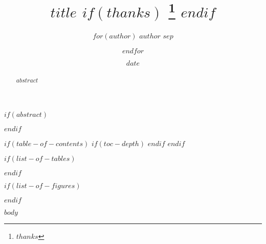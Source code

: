 \documentclass[
  $if(papersize)$
    $papersize$paper,
  $endif$
  $if(fontsize)$
    $fontsize$,
  $endif$
  $if(twocolumn)$
    twocolumn,
  $endif$
  $if(oneside)$
    oneside,
  $endif$
  $if(titlepage)$
    titlepage,
  $endif$
  $if(draft)$
    draft,
  $endif$
]{$document-type$}
\title{
    $title$
    $if(thanks)$
      \thanks{$thanks$}
    $endif$
  }
\author{
    $for(author)$
      $author$
      $sep$ \and 
    $endfor$
  }
\date{$date$}
\begin{document}
\maketitle

$if(abstract)$
  \begin{abstract}
    $abstract$
  \end{abstract}
$endif$

$if(table-of-contents)$
  $if(toc-depth)$
    \setcounter{tocdepth}{$toc-depth$}
  $endif$
  \tableofcontents
$endif$

$if(list-of-tables)$
  \listoftables
$endif$

$if(list-of-figures)$
  \listoffigures
$endif$

$body$
\end{document}
